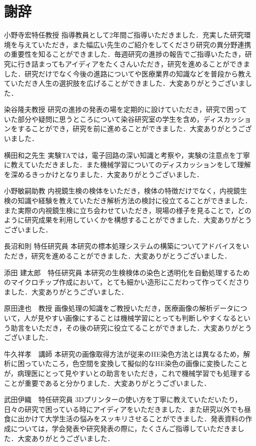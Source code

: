 \chapter*{謝辞}%
%

小野寺宏特任教授
指導教員として2年間ご指導いただきました．充実した研究環境を与えていただき，また幅広い先生のご紹介をしてくださり研究の異分野連携の重要性を知ることができました．毎週研究の進捗の報告でご指導いたたき，研究に行き詰まってもアイディアをたくさんいただき，研究を進めることができました．研究だけでなく今後の進路についてや医療業界の知識などを普段から教えていただき人生の選択肢を広げることができました．大変ありがとうございました．

染谷隆夫教授
研究の進捗の発表の場を定期的に設けていただき，研究で困っていた部分や疑問に思うところについて染谷研究室の学生を含め，ディスカッションをすることができ，研究を前に進めることができました．大変ありがとうございました．

横田和之先生
実験TAでは，電子回路の深い知識と考察や，実験の注意点を丁寧に教えていただきました．また機械学習についてのディスカッションをして理解を深めるきっかけとなりました．大変ありがとうございました．

小野敏嗣助教
内視鏡生検の検体をいただき，検体の特徴だけでなく，内視鏡生検の知識や経験を教えていただき解析方法の検討に役立てることができました．また実際の内視鏡生検に立ち会わせていただき，現場の様子を見ることで，どのように研究成果を利用していくかを構想することができました．大変ありがとうございました．

長沼和則 特任研究員
本研究の標本処理システムの構築についてアドバイスをいただき，研究を進めることができました．大変ありがとうございました．

添田 建太郎　特任研究員
本研究の生検検体の染色と透明化を自動処理するためのマイクロチップ作成において，とても細かい造形にこだわって作ってくださりました．大変ありがとうございました．

原田達也　教授
画像処理の知識をご教授いただき，医療画像の解析データについて，人が見やすい画像にすることは機械学習にとっても判断しやすくなるという助言をいただき，その後の研究に役立てることができました．大変ありがとうございました．

牛久祥孝　講師
本研究の画像取得方法が従来のHE染色方法とは異なるため，解析に困っていたころ，色空間を変換して擬似的なHE染色の画像に変換したことが，病理医にとって見やすいとの助言をいただき，これで機械学習でも処理することが重要であると分かりました．大変ありがとうございました．

武田伊織　特任研究員
3Dプリンターの使い方を丁寧に教えていただいたり，日々の研究で困っている時にアイディアをいただきました．また研究以外でも昼食に出かけて大学生活の悩みをスッキリさせることができました．発表資料の作成については，学会発表や研究発表の際に，たくさんご指導していただきました．大変ありがとうございました．

